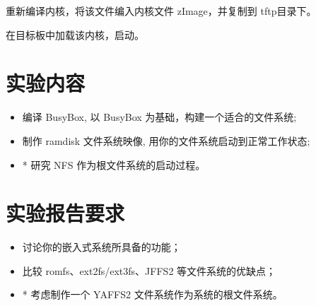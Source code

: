 	重新编译内核，将该文件编入内核文件 zImage，并复制到 tftp目录下。

	在目标板中加载该内核，启动。

\section{实验内容}
\begin{itemize}\itemsep=-3pt
  \item 编译 BusyBox, 以 BusyBox 为基础，构建一个适合的文件系统;
  \item 制作 ramdisk 文件系统映像, 用你的文件系统启动到正常工作状态;
  \item * 研究 NFS 作为根文件系统的启动过程。
\end{itemize}

\section{实验报告要求}
\begin{itemize}\itemsep=-3pt
  \item 讨论你的嵌入式系统所具备的功能；
  \item 比较 romfs、ext2fs/ext3fs、JFFS2 等文件系统的优缺点；
  \item * 考虑制作一个 YAFFS2 文件系统作为系统的根文件系统。
\end{itemize}
